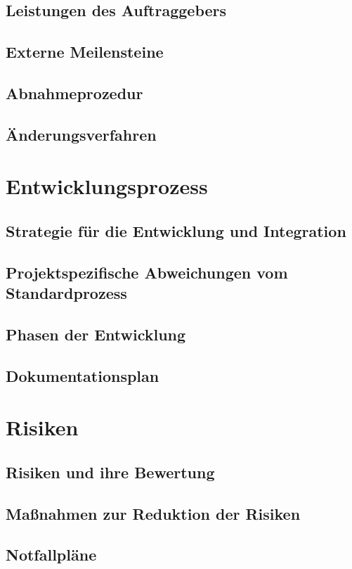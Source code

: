 \documentclass[a4paper,10pt]{scrartcl}
\begin{document}
\subsection{Leistungen des Auftraggebers}
\subsection{Externe Meilensteine}
\subsection{Abnahmeprozedur}
\subsection{Änderungsverfahren}



\section{Entwicklungsprozess}
\subsection{Strategie für die Entwicklung und Integration}
\subsection{Projektspezifische Abweichungen vom Standardprozess}
\subsection{Phasen der Entwicklung}
\subsection{Dokumentationsplan}


\section{Risiken}
\subsection{Risiken und ihre Bewertung}
\subsection{Maßnahmen zur Reduktion der Risiken}
\subsection{Notfallpläne}
\end{document}
